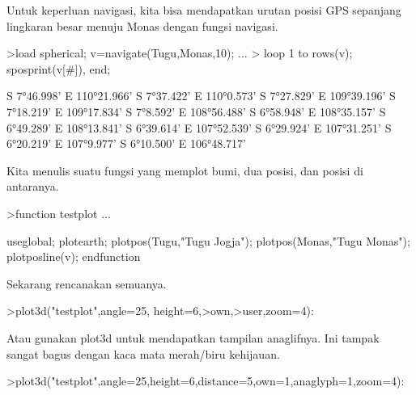 \documentclass[a4paper,10pt]{article}
\begin{document}
\begin{eulernotebook}
\begin{eulercomment}
\begin{eulercomment}
\begin{eulercomment}
\begin{eulercomment}
\begin{eulercomment}
\begin{eulercomment}
\begin{eulercomment}
\begin{eulercomment}
\begin{eulercomment}
\begin{eulercomment}
\begin{eulercomment}
\begin{eulercomment}
\begin{eulercomment}
\begin{eulercomment}
\begin{eulercomment}
\begin{eulercomment}
\begin{eulercomment}
\begin{eulercomment}
\begin{eulercomment}
\begin{eulercomment}
\begin{eulercomment}
\begin{eulercomment}
\begin{eulercomment}
\begin{eulercomment}
\begin{eulercomment}
\begin{eulercomment}
\begin{eulercomment}
\begin{eulercomment}
\begin{eulercomment}
\begin{eulercomment}
\begin{eulercomment}
Untuk keperluan navigasi, kita bisa mendapatkan urutan posisi GPS
sepanjang lingkaran besar menuju Monas dengan fungsi navigasi.
\end{eulercomment}
\begin{eulerprompt}
>load spherical; v=navigate(Tugu,Monas,10); ...
>  loop 1 to rows(v); sposprint(v[#]), end;
\end{eulerprompt}
\begin{euleroutput}
  S 7°46.998' E 110°21.966'
  S 7°37.422' E 110°0.573'
  S 7°27.829' E 109°39.196'
  S 7°18.219' E 109°17.834'
  S 7°8.592' E 108°56.488'
  S 6°58.948' E 108°35.157'
  S 6°49.289' E 108°13.841'
  S 6°39.614' E 107°52.539'
  S 6°29.924' E 107°31.251'
  S 6°20.219' E 107°9.977'
  S 6°10.500' E 106°48.717'
\end{euleroutput}
\begin{eulercomment}
Kita menulis suatu fungsi yang memplot bumi, dua posisi, dan posisi di
antaranya.
\end{eulercomment}
\begin{eulerprompt}
>function testplot ...
\end{eulerprompt}
\begin{eulerudf}
  useglobal;
  plotearth;
  plotpos(Tugu,"Tugu Jogja"); plotpos(Monas,"Tugu Monas");
  plotposline(v);
  endfunction
\end{eulerudf}
\begin{eulercomment}
Sekarang rencanakan semuanya.
\end{eulercomment}
\begin{eulerprompt}
>plot3d("testplot",angle=25, height=6,>own,>user,zoom=4):
\end{eulerprompt}
\begin{eulercomment}
Atau gunakan plot3d untuk mendapatkan tampilan anaglifnya. Ini tampak
sangat bagus dengan kaca mata merah/biru kehijauan.
\end{eulercomment}
\begin{eulerprompt}
>plot3d("testplot",angle=25,height=6,distance=5,own=1,anaglyph=1,zoom=4):

\end{eulerprompt}
\end{eulercomment}
\end{eulercomment}
\end{eulercomment}
\end{eulercomment}
\end{eulercomment}
\end{eulercomment}
\end{eulercomment}
\end{eulercomment}
\end{eulercomment}
\end{eulercomment}
\end{eulercomment}
\end{eulercomment}
\end{eulercomment}
\end{eulercomment}
\end{eulercomment}
\end{eulercomment}
\end{eulercomment}
\end{eulercomment}
\end{eulercomment}
\end{eulercomment}
\end{eulercomment}
\end{eulercomment}
\end{eulercomment}
\end{eulercomment}
\end{eulercomment}
\end{eulercomment}
\end{eulercomment}
\end{eulercomment}
\end{eulercomment}
\end{eulercomment}
\end{eulernotebook}
\end{document}
